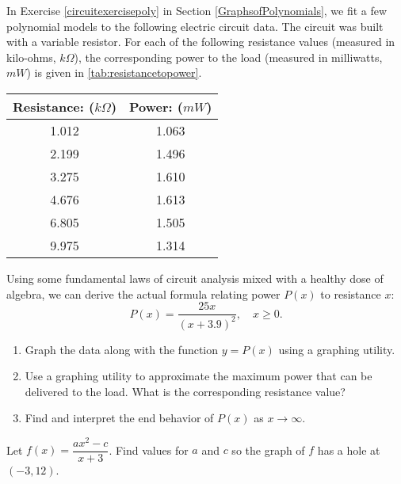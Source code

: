 \begin{exenum}
\item In Exercise \ref{circuitexercisepoly} in Section \ref{GraphsofPolynomials}, we fit a few polynomial models to the following electric circuit data. The circuit was built with a variable resistor.  For each of the following resistance values (measured in kilo-ohms, $k \Omega$),  the corresponding power to the load (measured in milliwatts, $mW$) is given in \autoref{tab:resistancetopower}.

\begin{mtable}

\begin{tabular}{|c|c|}
\hline
Resistance: ($k \Omega$) & Power: ($mW$) \\
\hline
1.012 & 1.063 \\
\hline
2.199 & 1.496 \\
\hline
3.275 & 1.610 \\
\hline
4.676 & 1.613 \\
\hline
6.805 & 1.505 \\
\hline
9.975 & 1.314 \\
\hline
\end{tabular}

\caption{}
\label{tab:resistancetopower}
\end{mtable}

\noindent Using some fundamental laws of circuit analysis mixed with a healthy dose of algebra, we can derive the actual formula relating power $P(x)$ to resistance $x$:   \[P(x) = \frac{25x}{(x + 3.9)^2}, \quad x \geq 0.\]

\begin{enumerate}

\item Graph the data along with the function $y = P(x)$ using a graphing utility.

\item Use a graphing utility to approximate the maximum power that can be delivered to the load.  What is the corresponding resistance value?

\item Find and interpret the end behavior of $P(x)$ as $x \rightarrow \infty$.

\end{enumerate}


\item  Let $f(x) = \dfrac{ax^2-c}{x+3}$.  Find values  for $a$ and  $c$ so  the graph of $f$ has a hole  at $(-3, 12)$.


\end{exenum}
